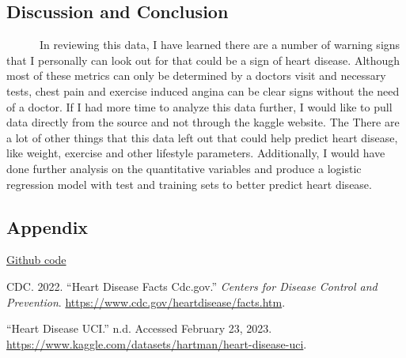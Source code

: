 \documentclass[
]{article}
\newlength{\cslhangindent}
\newlength{\cslentryspacingunit} %
\newenvironment{CSLReferences}[2] %
 {%
  \setlength{\parindent}{0pt}
  \ifodd #1
  \let\oldpar\par
  \def\par{\hangindent=\cslhangindent\oldpar}
  \fi
  \setlength{\parskip}{#2\cslentryspacingunit}
 }%
 {}
\begin{document}
\hypertarget{discussion-and-conclusion}{%
\subsection{Discussion and Conclusion}\label{discussion-and-conclusion}}

~~~~~~In reviewing this data, I have learned there are a number of
warning signs that I personally can look out for that could be a sign of
heart disease. Although most of these metrics can only be determined by
a doctors visit and necessary tests, chest pain and exercise induced
angina can be clear signs without the need of a doctor. If I had more
time to analyze this data further, I would like to pull data directly
from the source and not through the kaggle website. The There are a lot
of other things that this data left out that could help predict heart
disease, like weight, exercise and other lifestyle parameters.
Additionally, I would have done further analysis on the quantitative
variables and produce a logistic regression model with test and training
sets to better predict heart disease.

\hypertarget{appendix}{%
\subsection{Appendix}\label{appendix}}

\href{https://github.com/dutchess3030/HeartDisease/blob/main/doc/HeartDiseaseAnalysis.Rmd}{Github
code}

\hypertarget{refs}{}
\begin{CSLReferences}{1}{0}
\leavevmode{}%
CDC. 2022. {``Heart {Disease} {Facts} {\textbar} Cdc.gov.''}
\emph{Centers for Disease Control and Prevention}.
\url{https://www.cdc.gov/heartdisease/facts.htm}.

\leavevmode{}%
{``Heart {Disease} {UCI}.''} n.d. Accessed February 23, 2023.
\url{https://www.kaggle.com/datasets/hartman/heart-disease-uci}.

\end{CSLReferences}
\end{document}
